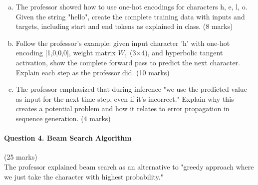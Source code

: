 \documentclass[12pt]{article}
\newcommand{\shortanswer}{\vspace{2cm}}
\newcommand{\mediumanswer}{\vspace{3cm}}
\newcommand{\journalspace}{\vspace{4.5cm}}
\begin{document}
\begin{enumerate}[(a)]
    \item The professor showed how to use one-hot encodings for characters h, e, l, o. Given the string "hello", create the complete training data with inputs and targets, including start and end tokens as explained in class. \hfill (8 marks)
    
    \journalspace
    
    \item Follow the professor's example: given input character 'h' with one-hot encoding [1,0,0,0], weight matrix $W_1$ (3×4), and hyperbolic tangent activation, show the complete forward pass to predict the next character. Explain each step as the professor did. \hfill (10 marks)
    
    \mediumanswer
    
    \item The professor emphasized that during inference "we use the predicted value as input for the next time step, even if it's incorrect." Explain why this creates a potential problem and how it relates to error propagation in sequence generation. \hfill (4 marks)
    
    \shortanswer
\end{enumerate}

\newpage
\paragraph{Question 4. Beam Search Algorithm}\hfill (25 marks)\\
The professor explained beam search as an alternative to "greedy approach where we just take the character with highest probability."
\end{document}
